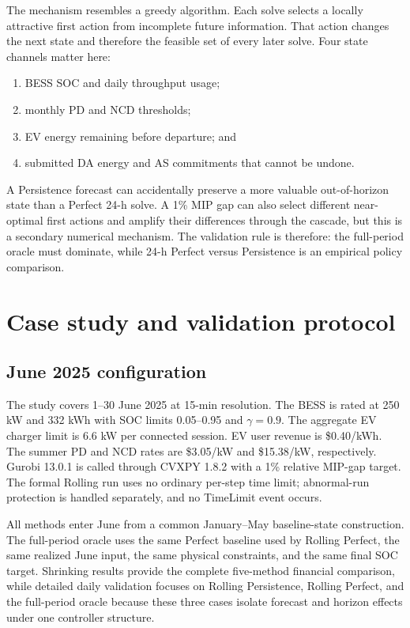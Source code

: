 \documentclass[final,5p,times]{elsarticle}
\begin{document}
The mechanism resembles a greedy algorithm. Each solve selects a locally
attractive first action from incomplete future information. That action changes
the next state and therefore the feasible set of every later solve. Four state
channels matter here:
\begin{enumerate}
  \item BESS SOC and daily throughput usage;
  \item monthly PD and NCD thresholds;
  \item EV energy remaining before departure; and
  \item submitted DA energy and AS commitments that cannot be undone.
\end{enumerate}
A Persistence forecast can accidentally preserve a more valuable out-of-horizon
state than a Perfect 24-h solve. A 1\% MIP gap can also select different
near-optimal first actions and amplify their differences through the cascade,
but this is a secondary numerical mechanism. The validation rule is therefore:
the full-period oracle must dominate, while 24-h Perfect versus Persistence is
an empirical policy comparison.

\section{Case study and validation protocol}
\label{sec:case}

\subsection{June 2025 configuration}
The study covers 1--30 June 2025 at 15-min resolution. The BESS is rated at
250 kW and 332 kWh with SOC limits 0.05--0.95 and $\gamma=0.9$. The aggregate EV
charger limit is 6.6 kW per connected session. EV user revenue is \$0.40/kWh.
The summer PD and NCD rates are \$3.05/kW and \$15.38/kW, respectively. Gurobi
13.0.1 is called through CVXPY 1.8.2 with a 1\% relative MIP-gap target. The
formal Rolling run uses no ordinary per-step time limit; abnormal-run protection
is handled separately, and no TimeLimit event occurs.

All methods enter June from a common January--May baseline-state construction.
The full-period oracle uses the same Perfect baseline used by Rolling Perfect,
the same realized June input, the same physical constraints, and the same final
SOC target. Shrinking results provide the complete five-method financial
comparison, while detailed daily validation focuses on Rolling Persistence,
Rolling Perfect, and the full-period oracle because these three cases isolate
forecast and horizon effects under one controller structure.
\end{document}
